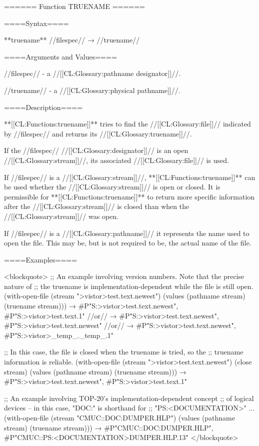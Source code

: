 ====== Function TRUENAME ======

====Syntax====

**truename** //filespec// → //truename//

====Arguments and Values====

//filespec// - a //[[CL:Glossary:pathname designator]]//.

//truename// - a //[[CL:Glossary:physical pathname]]//.

====Description====

**[[CL:Functions:truename]]** tries to find the //[[CL:Glossary:file]]// indicated by //filespec// and returns its //[[CL:Glossary:truename]]//.

If the //filespec// //[[CL:Glossary:designator]]// is an open //[[CL:Glossary:stream]]//, its associated //[[CL:Glossary:file]]// is used.

If //filespec// is a //[[CL:Glossary:stream]]//, **[[CL:Functions:truename]]** can be used whether the //[[CL:Glossary:stream]]// is open or closed. It is permissible for **[[CL:Functions:truename]]** to return more specific information after the //[[CL:Glossary:stream]]// is closed than when the //[[CL:Glossary:stream]]// was open.

If //filespec// is a //[[CL:Glossary:pathname]]// it represents the name used to open the file. This may be, but is not required to be, the actual name of the file.

====Examples====

<blockquote> ;; An example involving version numbers. Note that the precise nature of ;; the truename is implementation-dependent while the file is still open. (with-open-file (stream ">vistor>test.text.newest") (values (pathname stream) (truename stream))) → #P"S:>vistor>test.text.newest", #P"S:>vistor>test.text.1" //or// → #P"S:>vistor>test.text.newest", #P"S:>vistor>test.text.newest" //or// → #P"S:>vistor>test.text.newest", #P"S:>vistor>_temp_._temp_.1"

;; In this case, the file is closed when the truename is tried, so the ;; truename information is reliable. (with-open-file (stream ">vistor>test.text.newest") (close stream) (values (pathname stream) (truename stream))) → #P"S:>vistor>test.text.newest", #P"S:>vistor>test.text.1"

;; An example involving TOP-20's implementation-dependent concept ;; of logical devices -- in this case, "DOC:" is shorthand for ;; "PS:<DOCUMENTATION>" ... (with-open-file (stream "CMUC::DOC:DUMPER.HLP") (values (pathname stream) (truename stream))) → #P"CMUC::DOC:DUMPER.HLP", #P"CMUC::PS:<DOCUMENTATION>DUMPER.HLP.13" </blockquote>

